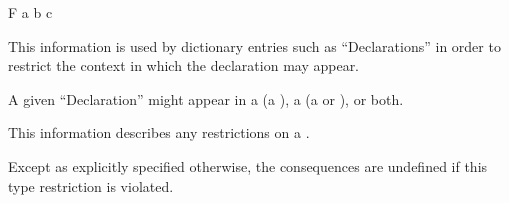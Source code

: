 \DefunNoReturn F {a b c}

\endsubsubsubsubsection%

\endsubsubsubsection%

\endsubsubsection%


This information is used by dictionary entries such as ``Declarations''
in order to restrict the context in which the declaration may appear.

A given ``Declaration'' might appear in 
     a  (\ie a  ),
     a  (\ie a  or  ),
  or both.

\endsubsubsection%


This information describes any  restrictions on a .

Except as explicitly specified otherwise,
the consequences are undefined if this type restriction is violated.

\endsubsubsection%

\endsubSection%
